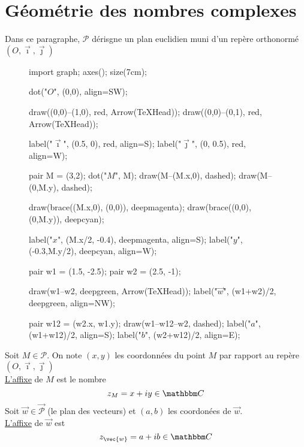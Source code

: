 \part{Géométrie des nombres complexes}

Dans ce paragraphe, $\mathcal{P}$ dérisgne un plan euclidien muni d'un repère orthonormé $(O, \vec{\imath}, \vec{\jmath})$\\

\begin{defn}
	\begin{wrapfigure}
		{r}{0.5\textwidth}
		\centering
		\begin{asy}
			import graph;
			axes(); size(7cm);

			dot("$O$", (0,0), align=SW);

			draw((0,0)--(1,0), red, Arrow(TeXHead));
			draw((0,0)--(0,1), red, Arrow(TeXHead));

			label("$\vec\imath$", (0.5, 0), red, align=S);
			label("$\vec\jmath$", (0, 0.5), red, align=W);


			pair M = (3,2);
			dot("$M$", M);
			draw(M--(M.x,0), dashed);
			draw(M--(0,M.y), dashed);

			draw(brace((M.x,0), (0,0)), deepmagenta);
			draw(brace((0,0), (0,M.y)), deepcyan);

			label("$x$", (M.x/2, -0.4), deepmagenta, align=S);
			label("$y$", (-0.3,M.y/2), deepcyan, align=W);

			pair w1 = (1.5, -2.5);
			pair w2 = (2.5, -1);

			draw(w1--w2, deepgreen, Arrow(TeXHead));
			label("$\vec{w}$", (w1+w2)/2, deepgreen, align=NW);
			
			pair w12 = (w2.x, w1.y);
			draw(w1--w12--w2, dashed);
			label("$a$", (w1+w12)/2, align=S);
			label("$b$", (w2+w12)/2, align=E);
		\end{asy}
	\end{wrapfigure}
	Soit $M \in \mathcal{P}$. On note $(x,y)$ les coordonnées du point $M$ par rapport au repère $(O, \vec{\imath}, \vec{\jmath})$\\
	\underline{L'affixe} de $M$ est le nombre \[
		z_M = x+iy \in \C
	\]
	Soit $\vec{w} \in \vec{\mathcal{P}}$ (le plan des vecteurs) et $(a,b)$ les coordonées de $\vec{w}$.\\
	\underline{L'affixe} de $\vec{w}$ est \[
		z_{\vec{w}} = a+ib \in \C
	\]
\end{defn}

\vspace{2cm}

